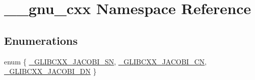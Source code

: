 \hypertarget{namespace____gnu__cxx}{}\section{\+\_\+\+\_\+gnu\+\_\+cxx Namespace Reference}
\label{namespace____gnu__cxx}
\subsection*{Enumerations}
\begin{DoxyCompactItemize}
\item 
enum \{ \hyperlink{namespace____gnu__cxx_ad6c62dd86a596716cece6ac2d4cfd4b3a3f3a4942031777493cbc33f592c941c7}{\+\_\+\+G\+L\+I\+B\+C\+X\+X\+\_\+\+J\+A\+C\+O\+B\+I\+\_\+\+S\+N}, 
\hyperlink{namespace____gnu__cxx_ad6c62dd86a596716cece6ac2d4cfd4b3a86d36c2efbbbfddcfb1e552853d72d65}{\+\_\+\+G\+L\+I\+B\+C\+X\+X\+\_\+\+J\+A\+C\+O\+B\+I\+\_\+\+C\+N}, 
\hyperlink{namespace____gnu__cxx_ad6c62dd86a596716cece6ac2d4cfd4b3a4576182edcbe93595def76dd1e61e0f7}{\+\_\+\+G\+L\+I\+B\+C\+X\+X\+\_\+\+J\+A\+C\+O\+B\+I\+\_\+\+D\+N}
 \}
\end{DoxyCompactItemize}
